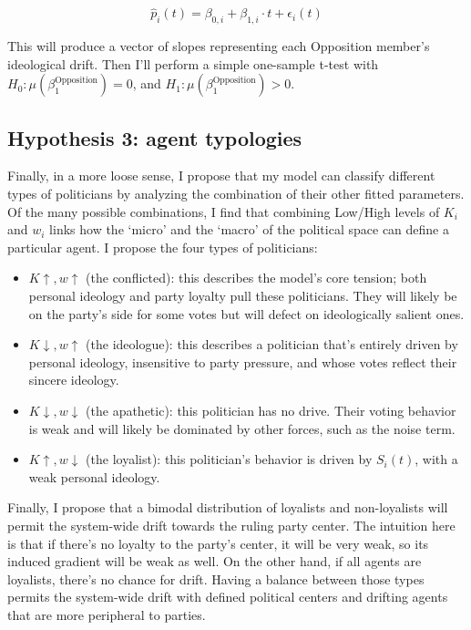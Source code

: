 \documentclass{article}
\begin{document}
	\begin{equation}
		\hat{p}_{i}(t) = \beta_{0, i} + \beta_{1, i} \cdot t + \epsilon_{i}(t)
	\end{equation}
	
	This will produce a vector of slopes representing each Opposition member's ideological drift. Then I'll perform a simple one-sample t-test with $H_{0}: \mu(\beta_{1}^{\text{Opposition}}) = 0$, and $H_{1}: \mu(\beta_{1}^{\text{Opposition}}) > 0$.
	
	\subsection{Hypothesis 3: agent typologies}
	Finally, in a more loose sense, I propose that my model can classify different types of politicians by analyzing the combination of their other fitted parameters. Of the many possible combinations, I find that combining Low/High levels of $K_{i}$ and $w_{i}$ links how the `micro' and the `macro' of the political space can define a particular agent. I propose the four types of politicians:
	
	\begin{itemize}
		\item $K \uparrow, w \uparrow$ (the conflicted): this describes the model's core tension; both personal ideology and party loyalty pull these politicians. They will likely be on the party's side for some votes but will defect on ideologically salient ones.
		\item $K \downarrow, w \uparrow$ (the ideologue): this describes a politician that's entirely driven by personal ideology, insensitive to party pressure, and whose votes reflect their sincere ideology.
		\item $K \downarrow, w \downarrow$ (the apathetic): this politician has no drive. Their voting behavior is weak and will likely be dominated by other forces, such as the noise term.
		\item $K \uparrow, w \downarrow$ (the loyalist): this politician's behavior is driven by $S_{i}(t)$, with a weak personal ideology.
	\end{itemize}
	
	Finally, I propose that a bimodal distribution of loyalists and non-loyalists will permit the system-wide drift towards the ruling party center. The intuition here is that if there's no loyalty to the party's center, it will be very weak, so its induced gradient will be weak as well. On the other hand, if all agents are loyalists, there's no chance for drift. Having a balance between those types permits the system-wide drift with defined political centers and drifting agents that are more peripheral to parties.
	
	\newpage
	
	\printbibliography
	
\end{document}
